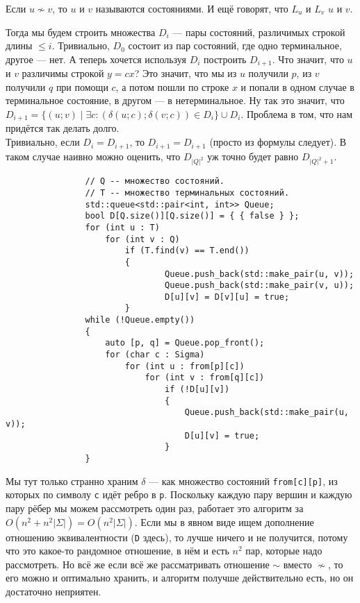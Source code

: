 \documentclass{article}
\begin{document}
\begin{itemize}
        \dfn Если $u\nsim v$, то $u$ и $v$ называются  состояниями. И ещё говорят, что $L_u$ и $L_v$  $u$ и $v$.
        \begin{Comment}
            Тогда мы будем строить множества $D_i$ --- пары состояний, различимых строкой длины $\leqslant i$. Тривиально, $D_0$ состоит из пар состояний, где одно терминальное, другое --- нет. А теперь хочется используя $D_i$ построить $D_{i+1}$. Что значит, что $u$ и $v$ различимы строкой $y=cx$? Это значит, что мы из $u$ получили $p$, из $v$ получили $q$ при помощи $c$, а потом пошли по строке $x$ и попали в одном случае в терминальное состояние, в другом --- в нетерминальное. Ну так это значит, что $D_{i+1}=\{(u;v)\mid \exists c:(\delta(u;c);\delta(v;c))\in D_i\}\cup D_i$. Проблема в том, что нам придётся так делать долго.\\
            Тривиально, если $D_i=D_{i+1}$, то $D_{i+1}=D_{i+1}$ (просто из формулы следует). В таком случае наивно можно оценить, что $D_{|Q|^2}$ уж точно будет равно $D_{|Q|^2+1}$.
            \begin{verbatim}
                // Q -- множество состояний.
                // T -- множество терминальных состояний.
                std::queue<std::pair<int, int>> Queue;
                bool D[Q.size()][Q.size()] = { { false } };
                for (int u : T)
                    for (int v : Q)
                        if (T.find(v) == T.end())
                        {
                                Queue.push_back(std::make_pair(u, v));
                                Queue.push_back(std::make_pair(v, u));
                                D[u][v] = D[v][u] = true;
                        }
                while (!Queue.empty())
                {
                    auto [p, q] = Queue.pop_front();
                    for (char c : Sigma)
                        for (int u : from[p][c])
                            for (int v : from[q][c])
                                if (!D[u][v])
                                {
                                    Queue.push_back(std::make_pair(u, v));
                                    D[u][v] = true;
                                }
                }
            \end{verbatim}
            Мы тут только странно храним $\delta$ --- как множество состояний \texttt{from[c][p]}, из которых по символу \texttt{c} идёт ребро в \texttt{p}. Поскольку каждую пару вершин и каждую пару рёбер мы можем рассмотреть один раз, работает это алгоритм за $O(n^2+n^2|\Sigma|)=O(n^2|\Sigma|)$. Если мы в явном виде ищем дополнение отношению эквивалентности (\texttt{D} здесь), то лучше ничего и не получится, потому что это какое-то рандомное отношение, в нём и есть $n^2$ пар, которые надо рассмотреть. Но всё же если всё же рассматривать отношение $\sim$ вместо $\nsim$, то его можно и оптимально хранить, и алгоритм получше действительно есть, но он достаточно неприятен.
        \end{Comment}
    \end{itemize}
\end{document}
